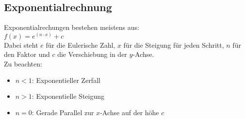 \subsection{Exponentialrechnung}
Exponentialrechungen bestehen meistens aus: \\
$
f(x) = e^{(n\cdot x)} + c
$ 
\\
Dabei steht $e$ für die Eulerische Zahl, $x$ für die Steigung für jeden Schritt, $n$ für den Faktor und $c$ die Verschiebung in der $y$-Achse. \\
Zu beachten: 
\begin{itemize}
    \item $n < 1$: Exponentieller Zerfall
    \item $n > 1$: Exponentielle Steigung
    \item $n = 0$: Gerade Parallel zur $x$-Achse auf der höhe $c$
\end{itemize}

